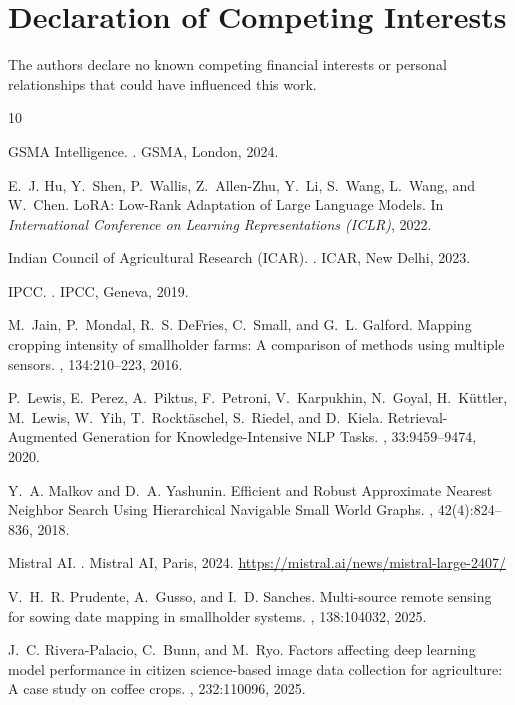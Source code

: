 \documentclass[10pt,twocolumn,letterpaper]{article}
\begin{document}
\section*{Declaration of Competing Interests}
The authors declare no known competing financial interests or personal relationships that could have influenced this work.

\begin{thebibliography}{10}

GSMA Intelligence.
.
\newblock GSMA, London, 2024.

E.~J. Hu, Y.~Shen, P.~Wallis, Z.~Allen-Zhu, Y.~Li, S.~Wang, L.~Wang, and
  W.~Chen.
\newblock LoRA: Low-Rank Adaptation of Large Language Models.
\newblock In {\em International Conference on Learning Representations (ICLR)},
  2022.

Indian Council of Agricultural Research (ICAR).
.
\newblock ICAR, New Delhi, 2023.

IPCC.
.
\newblock IPCC, Geneva, 2019.

M.~Jain, P.~Mondal, R.~S. DeFries, C.~Small, and G.~L. Galford.
\newblock Mapping cropping intensity of smallholder farms: A comparison of
  methods using multiple sensors.
, 134:210--223, 2016.

P.~Lewis, E.~Perez, A.~Piktus, F.~Petroni, V.~Karpukhin, N.~Goyal, H.~K\"{u}ttler,
  M.~Lewis, W.~Yih, T.~Rockt\"{a}schel, S.~Riedel, and D.~Kiela.
\newblock Retrieval-Augmented Generation for Knowledge-Intensive NLP Tasks.
,
  33:9459--9474, 2020.

Y.~A. Malkov and D.~A. Yashunin.
\newblock Efficient and Robust Approximate Nearest Neighbor Search Using
  Hierarchical Navigable Small World Graphs.
,
  42(4):824--836, 2018.

Mistral AI.
.
\newblock Mistral AI, Paris, 2024.
\newblock \url{https://mistral.ai/news/mistral-large-2407/}

V.~H.~R. Prudente, A.~Gusso, and I.~D. Sanches.
\newblock Multi-source remote sensing for sowing date mapping in smallholder
  systems.
,
  138:104032, 2025.

J.~C. Rivera-Palacio, C.~Bunn, and M.~Ryo.
\newblock Factors affecting deep learning model performance in citizen science-based image data collection for agriculture: A case study on coffee crops.
, 232:110096, 2025.

\end{thebibliography}
\end{document}
